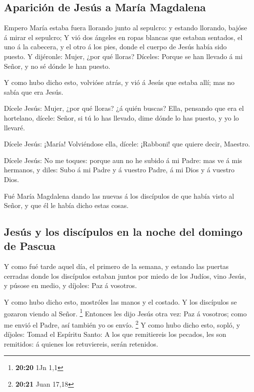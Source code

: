 \hypertarget{apariciuxf3n-de-jesuxfas-a-maruxeda-magdalena}{%
\subsection{Aparición de Jesús a María
Magdalena}\label{apariciuxf3n-de-jesuxfas-a-maruxeda-magdalena}}

 Empero María estaba fuera llorando junto al sepulcro: y
estando llorando, bajóse á mirar el sepulcro;  Y vió dos
ángeles en ropas blancas que estaban sentados, el uno á la cabecera, y
el otro á los pies, donde el cuerpo de Jesús había sido puesto.
 Y dijéronle: Mujer, ¿por qué lloras? Díceles: Porque se
han llevado á mi Señor, y no sé dónde le han puesto.

 Y como hubo dicho esto, volvióse atrás, y vió á Jesús que
estaba allí; mas no sabía que era Jesús.

 Dícele Jesús: Mujer, ¿por qué lloras? ¿á quién buscas?
Ella, pensando que era el hortelano, dícele: Señor, si tú lo has
llevado, dime dónde lo has puesto, y yo lo llevaré.

 Dícele Jesús: ¡María! Volviéndose ella, dícele: ¡Rabboni!
que quiere decir, Maestro.

 Dícele Jesús: No me toques: porque aun no he subido á mi
Padre: mas ve á mis hermanos, y diles: Subo á mi Padre y á vuestro
Padre, á mi Dios y á vuestro Dios.

 Fué María Magdalena dando las nuevas á los discípulos de
que había visto al Señor, y que él le había dicho estas cosas.

\hypertarget{jesuxfas-y-los-discuxedpulos-en-la-noche-del-domingo-de-pascua}{%
\subsection{Jesús y los discípulos en la noche del domingo de
Pascua}\label{jesuxfas-y-los-discuxedpulos-en-la-noche-del-domingo-de-pascua}}

 Y como fué tarde aquel día, el primero de la semana, y
estando las puertas cerradas donde los discípulos estaban juntos por
miedo de los Judíos, vino Jesús, y púsose en medio, y díjoles: Paz á
vosotros.

 Y como hubo dicho esto, mostróles las manos y el costado.
Y los discípulos se gozaron viendo al Señor. \footnote{\textbf{20:20}
  1Jn 1,1}  Entonces les dijo Jesús otra vez: Paz á
vosotros; como me envió el Padre, así también yo os envío. \footnote{\textbf{20:21}
  Juan 17,18}  Y como hubo dicho esto, sopló, y díjoles:
Tomad el Espíritu Santo:  A los que remitiereis los
pecados, les son remitidos: á quienes los retuviereis, serán retenidos.

